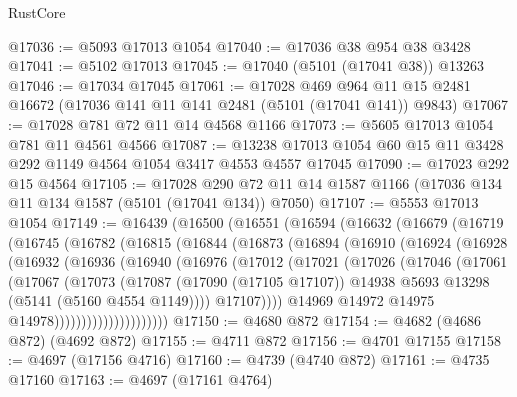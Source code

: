 \begin{lexlean}{RustCore}
\begin{coremodule}
@17036 := @5093 @17013 @1054
@17040 := @17036 @38 @954 @38 @3428
@17041 := @5102 @17013
@17045 := @17040 (@5101 (@17041 @38)) @13263
@17046 := @17034 @17045
@17061 := @17028
    @469
    @964
    @11
    @15
    @2481
    @16672
    (@17036 @141 @11 @141 @2481 (@5101 (@17041 @141)) @9843)
@17067 := @17028 @781 @72 @11 @14 @4568 @1166
@17073 := @5605 @17013 @1054 @781 @11 @4561 @4566
@17087 := @13238 @17013 @1054 @60 @15 @11 @3428 @292 @1149 @4564 @1054 @3417 @4553 @4557 @17045
@17090 := @17023 @292 @15 @4564
@17105 := @17028
    @290
    @72
    @11
    @14
    @1587
    @1166
    (@17036 @134 @11 @134 @1587 (@5101 (@17041 @134)) @7050)
@17107 := @5553 @17013 @1054
@17149 := @16439
    (@16500
      (@16551
        (@16594
          (@16632
            (@16679
              (@16719
                (@16745
                  (@16782
                    (@16815
                      (@16844
                        (@16873
                          (@16894
                            (@16910
                              (@16924
                                (@16928
                                  (@16932
                                    (@16936
                                      (@16940
                                        (@16976
                                          (@17012
                                            (@17021
                                              (@17026
                                                (@17046
                                                  (@17061
                                                    (@17067
                                                      (@17073
                                                        (@17087
                                                          (@17090 (@17105 @17107))
                                                          @14938
                                                          @5693
                                                          @13298
                                                          (@5141 (@5160 @4554 @1149))))
                                                      @17107))))
                                              @14969
                                              @14972
                                              @14975
                                              @14978)))))))))))))))))))))
@17150 := @4680 @872
@17154 := @4682 (@4686 @872) (@4692 @872)
@17155 := @4711 @872
@17156 := @4701 @17155
@17158 := @4697 (@17156 @4716)
@17160 := @4739 (@4740 @872)
@17161 := @4735 @17160
@17163 := @4697 (@17161 @4764)

\end{coremodule}
\end{lexlean}
